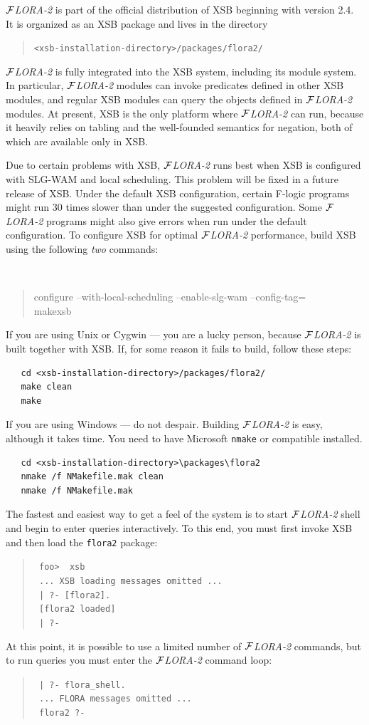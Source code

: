 \documentclass[11pt]{article}
\newcommand{\FLORA}{{\mbox{${\cal F}${\small\it LORA}\rm\emph{-2}}}\xspace}
\newcommand{\fl}{\mbox{F-logic}\xspace}
\begin{document}
\FLORA is part of the official distribution of XSB beginning with version
2.4. It is organized as an XSB package and lives in the directory
\begin{quote}
 \verb|<xsb-installation-directory>/packages/flora2/|  
\end{quote}
\FLORA is fully integrated into the XSB system, including its module
system. In particular, \FLORA modules can invoke predicates defined in
other XSB modules, and regular XSB modules can query the objects defined in
\FLORA modules. At present, XSB is the only platform where \FLORA can run,
because it heavily relies on tabling and the well-founded semantics for
negation, both of which are available only in XSB.

Due to certain problems with XSB, \FLORA runs best when XSB is configured
with SLG-WAM and local scheduling. This problem will be fixed in a future
release of XSB. Under the default XSB configuration, certain \fl programs might
run 30 times slower than under the suggested configuration. Some \FLORA
programs might also give errors when run under the default configuration.
To configure XSB for optimal \FLORA performance, build XSB using the
following \emph{two} commands:
{\tt
\begin{quote}
 configure --with-local-scheduling --enable-slg-wam --config-tag=\\
 makexsb
\end{quote}
}
If you are using Unix or Cygwin --- you are a lucky person, because \FLORA
is built together with XSB. If, for some reason it fails to build, follow
these steps:
\begin{verbatim}
   cd <xsb-installation-directory>/packages/flora2/
   make clean
   make
\end{verbatim}
If you are using Windows --- do not despair. Building \FLORA is easy,
although it takes time. You need to have Microsoft {\tt nmake} or
compatible installed.
\begin{verbatim}
   cd <xsb-installation-directory>\packages\flora2
   nmake /f NMakefile.mak clean
   nmake /f NMakefile.mak
\end{verbatim}

The fastest and easiest way to get a feel of the system
is to start \FLORA shell and begin to enter queries interactively.  To
this end, you must first invoke XSB and then load the {\tt flora2}
package:
\begin{quote}
  \tt
foo>~~xsb  \\
\tt
... XSB loading messages omitted ...\\
\tt
| ?- [flora2].\\
\tt
[flora2 loaded]\\
\tt
| ?-
\end{quote}
At this point, it is possible to use a limited number of \FLORA
commands, but to run queries you must enter the \FLORA command loop:
\begin{quote}
  \tt
| ?- flora\_shell.  \\
 \tt
... FLORA messages omitted ... \\
 \tt
flora2 ?-
\end{quote}
\end{document}
